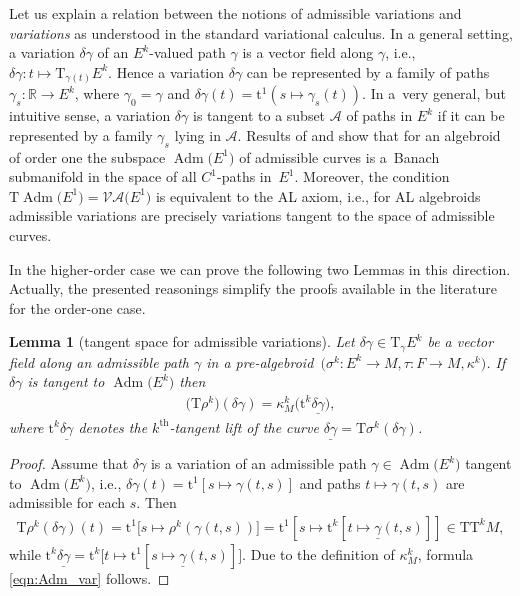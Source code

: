 \documentclass[pdftex]{sigma}
\newcommand{\thh}[1]{#1^{\mathrm{th}}} %
\newcommand{\R}{\mathbb{R}}
\newcommand{\und}{\underline}
\newcommand{\ra}{\rightarrow}
\newcommand{\prealg}{pre-algebroid} %
\newcommand{\T}{\mathrm{T}} %
\newcommand{\TT}[1]{\mathrm{T}^{#1}} %
\newcommand{\tclass}[2]{\bm{\mathrm{t}}^{#1}#2} %
\newcommand{\Adm}{\operatorname{Adm}} %
\newcommand{\VA}{\mathcal{VA}} %
\numberwithin{equation}{section}
\newtheorem{lem}[thm]{Lemma}
\theoremstyle{definition}
\begin{document}
Let us explain a relation between the notions of admissible variations and \emph{variations} as understood in the standard variational calculus. In a general setting, a variation $\delta \gamma$ of an $E^k$-valued path $\gamma$ is a vector field along $\gamma$, i.e., $\delta\gamma\colon t\mapsto \T_{\gamma(t)} E^k$. Hence a variation $\delta \gamma$ can be represented by a family of paths $\gamma_s\colon \R\ra E^k$, where $\gamma_0 = \gamma$ and $\delta\gamma(t) = \tclass 1{(s\mapsto \gamma_s(t))}$. In a~very general, but intuitive sense, a variation $\delta \gamma$ is tangent to a subset $\mathcal{A}$ of paths in $E^k$ if it can be represented by a family $\gamma_s$ lying in $\mathcal{A}$. Results of \cite{Martinez_2008} and \cite[Theorem~3]{GG_var_calc_gen_alg_2008} show that for an algebroid of order one the subspace $\Adm\big(E^1\big)$
of admissible curves is a~Banach submanifold in the space of all $C^1$-paths in~$E^1$. Moreover, the condition $\T \Adm\big(E^1\big) =\VA\big(E^1\big)$ is equivalent to the AL axiom, i.e., for AL algebroids admissible variations are precisely variations tangent to the space of admissible curves.

 In the higher-order case we can prove the following two Lemmas in this direction. Actually, the presented reasonings simplify the proofs available in the literature for the order-one case.

\begin{lem}[tangent space for admissible variations] \label{lem:adm1} Let $\delta \gamma \in \T_\gamma E^k$ be a vector field along an admissible path $\gamma$ in a \prealg\ $\big(\sigma^k \colon E^k \ra M,\tau\colon F\ra M, \kappa^k\big)$. If $\delta \gamma$ is tangent to $\Adm\big(E^k\big)$ then{\samepage
\begin{gather}\label{eqn:Adm_var}
\big(\T \rho^k\big) (\delta \gamma) = \kappa^k_M\big(\tclass{k}{\und{\delta\gamma}}\big),
\end{gather}
where $\tclass{k}{\und{\delta\gamma}}$ denotes the $\thh{k}$-tangent lift of the curve $\und{\delta\gamma} = \T \sigma^k (\delta \gamma)$.}
\end{lem}
\begin{proof}Assume that $\delta \gamma$ is a variation of an admissible path $\gamma\in\Adm\big(E^k\big)$ tangent to $\Adm\big(E^k\big)$, i.e., $\delta \gamma(t) = \tclass{1}{[s\mapsto \gamma(t,s)]}$ and paths $t\mapsto \gamma(t,s)$ are admissible for each $s$. Then
\begin{gather*}
\T \rho^k (\delta\gamma)(t) = \tclass{1}{\big[s\mapsto \rho^k(\gamma(t, s))\big]} = \tclass{1}{[s\mapsto \tclass{k}{[t\mapsto \und{\gamma}(t, s)]}]} \in \T \TT{k} M,
\end{gather*}
while $ \tclass{k}{\und{\delta \gamma}} = \tclass{k}{\big[t\mapsto\tclass{1}{[s\mapsto \und{\gamma}(t, s)]}\big]}$. Due to the definition of $\kappa^k_M$, formula \eqref{eqn:Adm_var} follows.
\end{proof}
\end{document}
